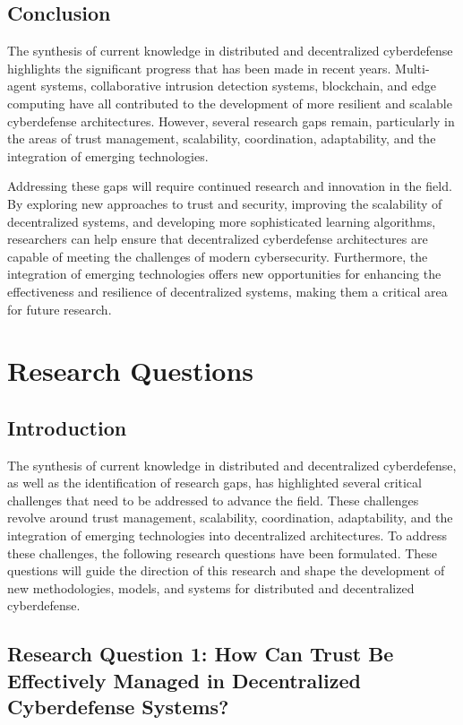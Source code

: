 \subsection{Conclusion}

The synthesis of current knowledge in distributed and decentralized cyberdefense highlights the significant progress that has been made in recent years. Multi-agent systems, collaborative intrusion detection systems, blockchain, and edge computing have all contributed to the development of more resilient and scalable cyberdefense architectures. However, several research gaps remain, particularly in the areas of trust management, scalability, coordination, adaptability, and the integration of emerging technologies.

Addressing these gaps will require continued research and innovation in the field. By exploring new approaches to trust and security, improving the scalability of decentralized systems, and developing more sophisticated learning algorithms, researchers can help ensure that decentralized cyberdefense architectures are capable of meeting the challenges of modern cybersecurity. Furthermore, the integration of emerging technologies offers new opportunities for enhancing the effectiveness and resilience of decentralized systems, making them a critical area for future research.



\section{Research Questions}

\subsection{Introduction}

The synthesis of current knowledge in distributed and decentralized cyberdefense, as well as the identification of research gaps, has highlighted several critical challenges that need to be addressed to advance the field. These challenges revolve around trust management, scalability, coordination, adaptability, and the integration of emerging technologies into decentralized architectures. To address these challenges, the following research questions have been formulated. These questions will guide the direction of this research and shape the development of new methodologies, models, and systems for distributed and decentralized cyberdefense.

\subsection{Research Question 1: How Can Trust Be Effectively Managed in Decentralized Cyberdefense Systems?}

